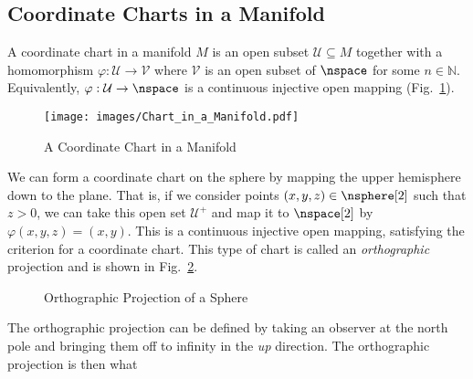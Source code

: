 \documentclass[oneside]{book}                                                  %
\begin{document}
            \subsection{Coordinate Charts in a Manifold}
                A coordinate chart in a manifold $M$ is an open subset
                $\mathcal{U}\subseteq{M}$ together with a homomorphism
                $\varphi:\mathcal{U}\rightarrow\mathcal{V}$ where $\mathcal{V}$
                is an open subset of $\nspace$ for some $n\in\mathbb{N}$.
                Equivalently, $\varphi:\mathcal{U}\rightarrow\nspace$ is a
                continuous injective open mapping
                (Fig.~\ref{fig:Coordinate_Chart}).
                \begin{figure}[H]
                    \centering
                    \captionsetup{type=figure}
                    \texttt{[image: images/Chart\_in\_a\_Manifold.pdf]}
                    \caption{A Coordinate Chart in a Manifold}
                    \label{fig:Coordinate_Chart}
                \end{figure}
                \begin{example}
                    We can form a coordinate chart on the sphere by mapping the
                    upper hemisphere down to the plane. That is, if we consider
                    points $(x,y,z)\in\nsphere[2]$ such that $z>0$, we can take
                    this open set $\mathcal{U}^{+}$ and map it to $\nspace[2]$
                    by $\varphi(x,y,z)=(x,y)$. This is a continuous injective
                    open mapping, satisfying the criterion for a coordinate
                    chart. This type of chart is called an \textit{orthographic}
                    projection and is shown in
                    Fig.~\ref{fig:Sphere_Orthographic_Projection}.
                \end{example}
                \begin{figure}
                    \centering
                    \captionsetup{type=figure}
                    \caption{Orthographic Projection of a Sphere}
                    \label{fig:Sphere_Orthographic_Projection}
                \end{figure}
                The orthographic projection can be defined by taking an observer
                at the north pole and bringing them off to infinity in the
                \textit{up} direction. The orthographic projection is then what
\end{document}
